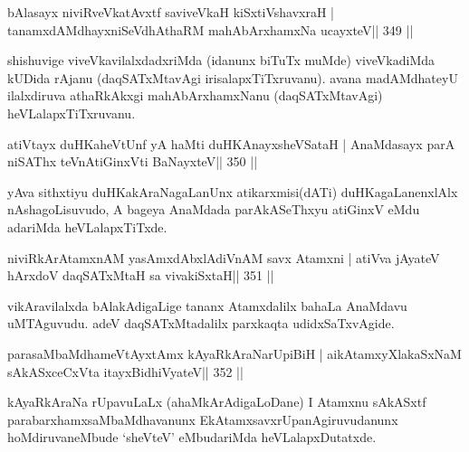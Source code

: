 
\begin{shl}
bAlasayx niviRveVkatAvxtf saviveVkaH kiSxtiVshavxraH |
tanamxdAMdhayxniSeVdhAthaRM mahAbArxhamxNa ucayxteV\hfill || 349 ||
\end{shl}

\begin{artha}
shishuvige viveVkavilalxdadxriMda (idanunx biTuTx muMde) viveVkadiMda  kUDida rAjanu (daqSATxMtavAgi irisalapxTiTxruvanu). avana madAMdhateyU ilalxdiruva athaRkAkxgi mahAbArxhamxNanu (daqSATxMtavAgi) heVLalapxTiTxruvanu.
\end{artha}



\begin{shl}
atiVtayx duHKaheVtUnf yA haMti duHKAnayxsheVSataH |
AnaMdasayx parA niSAThx teVnAtiGinxVti BaNayxteV\hfill || 350 ||
\end{shl}

\begin{artha}
yAva sithxtiyu duHKakAraNagaLanUnx atikarxmisi(dATi) duHKagaLanenxlAlx nAshagoLisuvudo, A bageya AnaMdada parAkASeThxyu atiGinxV eMdu adariMda heVLalapxTiTxde.
\end{artha}


\begin{shl}
niviRkArAtamxnAM yasAmxdAbxlAdiVnAM savx Atamxni |
atiVva jAyateV hArxdoV daqSATxMtaH sa vivakiSxtaH\hfill || 351 ||
\end{shl}

\begin{artha}
vikAravilalxda bAlakAdigaLige tananx Atamxdalilx bahaLa AnaMdavu  uMTAguvudu. adeV daqSATxMtadalilx parxkaqta udidxSaTxvAgide.
\end{artha}


\begin{shl}
parasaMbaMdhameVtAyxtAmx kAyaRkAraNarUpiBiH |
aikAtamxyXlakaSxNaM sAkASxceCxVta itayxBidhiVyateV\hfill || 352 ||
\end{shl}

\begin{artha}
kAyaRkAraNa rUpavuLaLx (ahaMkArAdigaLoDane) I Atamxnu sAkASxtf  parabarxhamxsaMbaMdhavanunx EkAtamxsavxrUpanAgiruvudanunx  hoMdiruvaneMbude `sheVteV' eMbudariMda heVLalapxDutatxde.
\end{artha}


